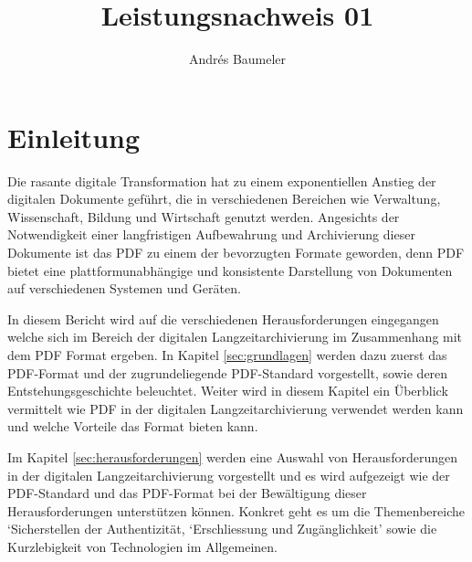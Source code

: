 \documentclass[a4paper,oneside, 12pt]{report}
\title{Leistungsnachweis 01}
\author{Andrés Baumeler}
\begin{document}

\pagestyle{empty} %





\cleardoublepage
\tableofcontents %
\cleardoublepage %

\pagestyle{plain} %



\chapter{Einleitung}\label{sec:motivation}
Die rasante digitale Transformation hat zu einem exponentiellen Anstieg der digitalen Dokumente geführt, die in verschiedenen Bereichen wie Verwaltung, Wissenschaft, Bildung und Wirtschaft genutzt werden. Angesichts der Notwendigkeit einer langfristigen Aufbewahrung und Archivierung dieser Dokumente ist das \ac{PDF} zu einem der bevorzugten Formate geworden, denn \ac{PDF} bietet eine plattformunabhängige und konsistente Darstellung von Dokumenten auf verschiedenen Systemen und Geräten.

In diesem Bericht wird auf die verschiedenen Herausforderungen eingegangen welche sich im Bereich der digitalen Langzeitarchivierung im Zusammenhang mit dem \ac{PDF} Format ergeben. In Kapitel \ref{sec:grundlagen} werden dazu zuerst das \ac{PDF}-Format und der zugrundeliegende \ac{PDF}-Standard vorgestellt, sowie deren Entstehungsgeschichte beleuchtet. Weiter wird in diesem Kapitel ein Überblick vermittelt wie \ac{PDF} in der digitalen Langzeitarchivierung verwendet werden kann und welche Vorteile das Format bieten kann. 

Im Kapitel \ref{sec:herausforderungen} werden eine Auswahl von Herausforderungen in der digitalen Langzeitarchivierung vorgestellt und es wird aufgezeigt wie der PDF-Standard und das PDF-Format bei der Bewältigung dieser Herausforderungen unterstützen können. Konkret geht es um die Themenbereiche `Sicherstellen der Authentizität, `Erschliessung und Zugänglichkeit' sowie die Kurzlebigkeit von Technologien im Allgemeinen.
\end{document}
